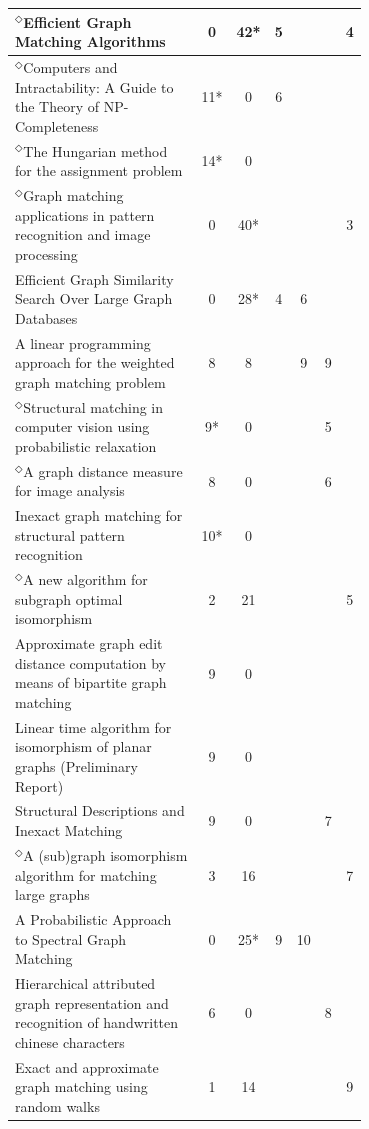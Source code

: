 \documentclass[12pt]{thesis}
\theoremstyle{plain}
\theoremstyle{definition}
\theoremstyle{remark}
\begin{document}
\begin{table}[H]
{\begin{tabular}{|L{0.7\linewidth}|c|c|c|c|c|c|}
$^\Diamond$Efficient Graph Matching Algorithms  \cite{Messmer_1995} & 0 & 42* & 5 &  &  & 4 \\ \hline
$^\Diamond$Computers and Intractability: A Guide to the Theory of NP-Completeness  \cite{Hartmanis_1982} & 11* & 0 & 6 &  &  &  \\ \hline
$^\Diamond$The Hungarian method for the assignment problem  \cite{Kuhn_1955} & 14* & 0 &  &  &  &  \\ \hline
$^\Diamond$Graph matching applications in pattern recognition and image processing  \cite{Conte_2003} & 0 & 40* &  &  &  & 3 \\ \hline
Efficient Graph Similarity Search Over Large Graph Databases  \cite{Zheng_2015} & 0 & 28* & 4 & 6 &  &  \\ \hline
A linear programming approach for the weighted graph matching problem  \cite{Almohamad_1993} & 8 & 8 &  & 9 & 9 &  \\ \hline
$^\Diamond$Structural matching in computer vision using probabilistic relaxation  \cite{Christmas_1995} & 9* & 0 &  &  & 5 &  \\ \hline
$^\Diamond$A graph distance measure for image analysis  \cite{Eshera_1984} & 8 & 0 &  &  & 6 &  \\ \hline
Inexact graph matching for structural pattern recognition  \cite{Bunke_1983} & 10* & 0 &  &  &  &  \\ \hline
$^\Diamond$A new algorithm for subgraph optimal isomorphism  \cite{El_Sonbaty_1998} & 2 & 21 &  &  &  & 5 \\ \hline
Approximate graph edit distance computation by means of bipartite graph matching  \cite{Riesen_2009} & 9 & 0 &  &  &  &  \\ \hline
Linear time algorithm for isomorphism of planar graphs (Preliminary Report)  \cite{Hopcroft_1974} & 9 & 0 &  &  &  &  \\ \hline
Structural Descriptions and Inexact Matching  \cite{Shapiro_1981} & 9 & 0 &  &  & 7 &  \\ \hline
$^\Diamond$A (sub)graph isomorphism algorithm for matching large graphs  \cite{Cordella_2004} & 3 & 16 &  &  &  & 7 \\ \hline
A Probabilistic Approach to Spectral Graph Matching  \cite{Egozi_2013} & 0 & 25* & 9 & 10 &  &  \\ \hline
Hierarchical attributed graph representation and recognition of handwritten chinese characters  \cite{Lu_1991} & 6 & 0 &  &  & 8 &  \\ \hline
Exact and approximate graph matching using random walks  \cite{Gori_2005} & 1 & 14 &  &  &  & 9 \\ \hline

\end{tabular}}
\end{table}
\end{document}
